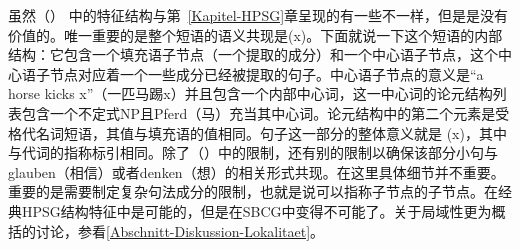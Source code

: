 \begin{figure}
\eanoraggedright
{}
\z
\vspace{-\baselineskip}
\end{figure}%
\addlines[-1]
虽然（） 中的特征结构与第~\ref{Kapitel-HPSG}章呈现的有一些不一样，但是是没有价值的。唯一重要的是整个短语的语义共现是(x)。下面就说一下这个短语的内部结构：它包含一个填充语子节点（一个提取的成分）和一个中心语子节点，这个中心语子节点对应着一个一些成分已经被提取的句子。中心语子节点的意义是“a horse kicks x”（一匹马踢x）并且包含一个内部中心词，这一中心词的论元结构列表包含一个不定式NP且Pferd（马）充当其中心词。论元结构中的第二个元素是受格代名词短语，其\localc 值与填充语的\localc 值相同。句子这一部分的整体意义就是 (x)，其中与代词的指称标引相同。除了（）中的限制，还有别的限制以确保该部分小句与glauben（相信）或者denken（想）的相关形式共现。在这里具体细节并不重要。重要的是需要制定复杂句法成分的限制，也就是说可以指称子节点的子节点。在经典HPSG结构特征中是可能的，但是在SBCG中变得不可能了。关于局域性更为概括的讨论，参看\ref{Abschnitt-Diskussion-Lokalitaet}。
